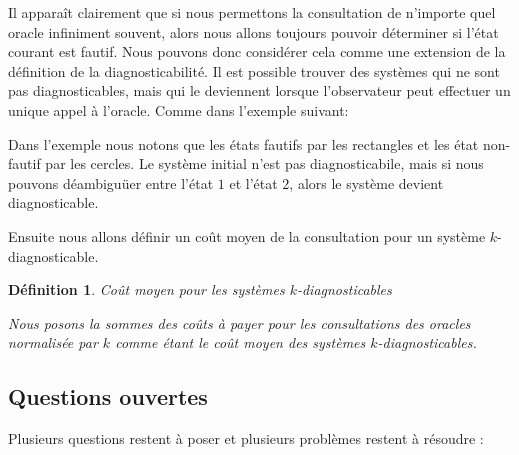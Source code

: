 \documentclass[a4paper,10pt]{article}
\newtheorem{mydef}{D\'efinition}
\begin{document}
Il apparaît clairement que si nous permettons la consultation de n'importe quel oracle infiniment souvent, alors nous allons toujours pouvoir d\'eterminer si l'\'etat courant est fautif. Nous pouvons donc consid\'erer cela comme une extension de la d\'efinition de la diagnosticabilit\'e. Il est possible trouver des syst\`emes qui ne sont pas diagnosticables, mais qui le deviennent lorsque l'observateur peut effectuer un unique appel à l'oracle. Comme dans l'exemple suivant:

\begin{figure}[H]
  \begin{center}
  \end{center}
\end{figure}

Dans l'exemple nous notons que les \'etats fautifs par les rectangles et les \'etat non-fautif par les cercles. Le syst\`eme initial n'est pas diagnosticabile, mais si nous pouvons d\'eambigu\"uer entre l'\'etat $1$ et l'\'etat $2$, alors le syst\`eme devient diagnosticable.

Ensuite nous allons d\'efinir un co\^ut moyen de la consultation pour un syst\`eme $k$-diagnosticable.

\begin{mydef}{Co\^ut moyen pour les syst\`emes $k$-diagnosticables}
  
  Nous posons la sommes des co\^uts \`a payer pour les consultations des oracles normalis\'ee par $k$ comme \'etant le co\^ut moyen des syst\`emes $k$-diagnosticables.
\end{mydef}

\subsection{Questions ouvertes}

Plusieurs questions restent à poser et plusieurs problèmes restent à résoudre :
\end{document}
